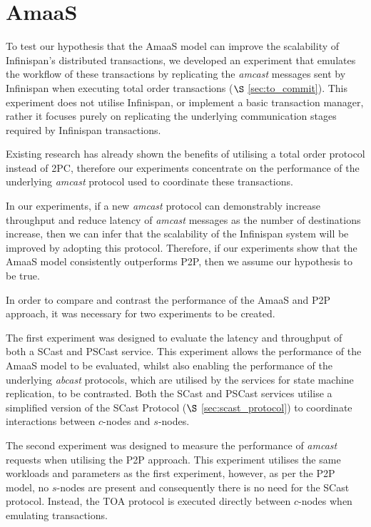 \section{AmaaS}\label{sec:emulated_transactions}
	To test our hypothesis that the \textsf{AmaaS} model can improve the scalability of Infinispan's distributed transactions, we developed an experiment that emulates the workflow of these transactions by replicating the \emph{amcast} messages sent by Infinispan when executing total order transactions ($\S$ \ref{sec:to_commit}).  This experiment does not utilise Infinispan, or implement a basic transaction manager, rather it focuses purely on replicating the underlying communication stages required by Infinispan transactions.  
	
	Existing research \citep{Ruivo:2011:ETO:2120967.2121604} has already shown the benefits of utilising a total order protocol instead of 2PC, therefore our experiments concentrate on the performance of the underlying \emph{amcast} protocol used to coordinate these transactions.  
	
	In our experiments, if a new \emph{amcast} protocol can demonstrably increase throughput and reduce latency of \emph{amcast} messages as the number of destinations increase,  then we can infer that the scalability of the Infinispan system will be improved by adopting this protocol.  Therefore, if our experiments show that the \textsf{AmaaS} model consistently outperforms P2P, then we assume our hypothesis to be true. 
	
   In order to compare and contrast the performance of the \textsf{AmaaS} and P2P approach, it was necessary for two experiments to be created.  
   
   The first experiment was designed to evaluate the latency and throughput of both a \textsf{SCast} and \textsf{PSCast} service.  This experiment allows the performance of the \textsf{AmaaS} model to be evaluated, whilst also enabling the performance of the underlying \emph{abcast} protocols, which are utilised by the services for state machine replication, to be contrasted.  Both the \textsf{SCast} and \textsf{PSCast} services utilise a simplified version of  the \textsf{SCast} Protocol ($\S$ \ref{sec:scast_protocol}) to coordinate interactions between $c$-nodes and $s$-nodes.  

   The second experiment was designed to measure the performance of \emph{amcast} requests when utilising the P2P approach.  This experiment utilises the same workloads and parameters as the first experiment, however, as per the P2P model, no $s$-nodes are present and consequently there is no need for the \textsf{SCast} protocol.  Instead, the TOA protocol is executed directly between $c$-nodes when emulating transactions.  
   

